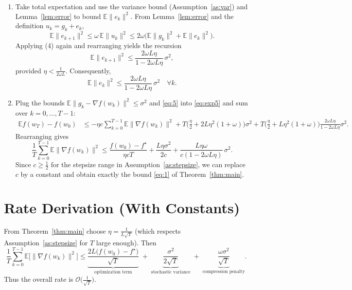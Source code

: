 \documentclass{article}
\newcommand{\E}{\mathbb{E}}
\begin{document}
\begin{enumerate}
\begin{align}
    \E\!\big[f(w_{k+1})\mid\mathcal{F}_k\big]
    &\le f(w_k)-\eta c\|\nabla f(w_k)\|^{2}
      +\big(\tfrac{\eta}{2}+2L\eta^{2}(1+\omega)\big)\|g_k-\nabla f(w_k)\|^{2}
      +\big(\tfrac{\eta}{2}+L\eta^{2}(1+\omega)\big)\|e_k\|^{2}. \label{eq:exp5}
\end{align}
\item[Step 11.] Take total expectation and use the variance bound (Assumption~\ref{as:var}) and Lemma~\ref{lem:error} to bound $\E\|e_k\|^{2}$. From Lemma~\ref{lem:error} and the definition $u_k=g_k+e_k$,
\[
    \E\|e_{k+1}\|^{2}\le \omega\,\E\|u_k\|^{2}
    \le 2\omega\big(\E\|g_k\|^{2}+\E\|e_k\|^{2}\big).
\]
Applying (4) again and rearranging yields the recursion
\[
    \E\|e_{k+1}\|^{2}\le\frac{2\omega L\eta}{1-2\omega L\eta}\,\sigma^{2},
\]
provided $\eta<\frac{1}{2\omega L}$. Consequently,
\[
    \E\|e_k\|^{2}\le \frac{2\omega L\eta}{1-2\omega L\eta}\,\sigma^{2}\quad\forall k. \tag{5}
\]
\item[Step 12.] Plug the bounds $\E\|g_k-\nabla f(w_k)\|^{2}\le\sigma^{2}$ and \eqref{eq:5} into \eqref{eq:exp5} and sum over $k=0,\dots,T-1$:
\begin{align}
    \E f(w_T)-f(w_0)
    &\le -\eta c\sum_{k=0}^{T-1}\E\|\nabla f(w_k)\|^{2}
      +T\Big(\tfrac{\eta}{2}+2L\eta^{2}(1+\omega)\Big)\sigma^{2}
      +T\Big(\tfrac{\eta}{2}+L\eta^{2}(1+\omega)\Big)\frac{2\omega L\eta}{1-2\omega L\eta}\sigma^{2}. \label{eq:sum}
\end{align}
Rearranging gives
\[
    \frac{1}{T}\sum_{k=0}^{T-1}\E\|\nabla f(w_k)\|^{2}
    \le \frac{f(w_0)-f^{\star}}{\eta c T}
      +\frac{L\eta\sigma^{2}}{2c}
      +\frac{L\eta\omega}{c(1-2\omega L\eta)}\,\sigma^{2}.
\]
Since $c\ge\frac12$ for the stepsize range in Assumption~\ref{as:stepsize}, we can replace $c$ by a constant and obtain exactly the bound \eqref{eq:1} of Theorem~\ref{thm:main}. \hfill\qedsymbol
\end{enumerate}

\section*{Rate Derivation (With Constants)}
From Theorem~\ref{thm:main} choose $\eta = \frac{1}{L\sqrt{T}}$ (which respects Assumption~\ref{as:stepsize} for $T$ large enough). Then
\[
    \frac{1}{T}\sum_{k=0}^{T-1}\E\!\big[\|\nabla f(w_k)\|^{2}\big]
    \le
    \underbrace{\frac{2L\big(f(w_0)-f^{\star}\big)}{\sqrt{T}}}_{\text{optimization term}}
    \;+\;
    \underbrace{\frac{\sigma^{2}}{2\sqrt{T}}}_{\text{stochastic variance}}
    \;+\;
    \underbrace{\frac{\omega\sigma^{2}}{\sqrt{T}}}_{\text{compression penalty}}.
\]
Thus the overall rate is $\mathcal{O}\!\big(\frac{1}{\sqrt{T}}\big)$.
\end{document}
